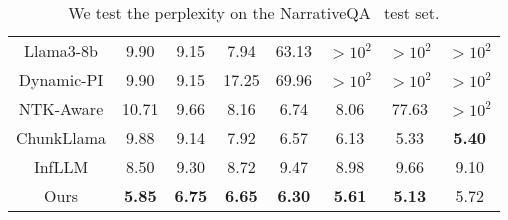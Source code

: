 \begin{table}[t]
{\begin{tabular}{cccccccc}
\renewcommand{\arraystretch}{1} %
Llama3-8b & 9.90  & 9.15  & 7.94  & 63.13 & $>10^2$ & $>10^2$ & $>10^2$   \\

\arrayrulecolor[gray]{0.8}
\midrule
\arrayrulecolor{black}
Dynamic-PI  & 9.90  & 9.15  & 17.25 & 69.96  & $>10^2$ & $>10^2$ & $>10^2$\\
NTK-Aware  & 10.71 & 9.66  & 8.16  & 6.74  & 8.06 &  77.63 & $>10^2$ \\
ChunkLlama & 9.88  & 9.14  & 7.92  & 6.57  & 6.13   & 5.33 & \textbf{5.40} \\
InfLLM & 8.50  & 9.30  & 8.72  & 9.47  & 8.98   &  9.66 & 9.10 \\
Ours & \textbf{5.85}  & \textbf{6.75}  & \textbf{6.65}  & \textbf{6.30}  & \textbf{5.61}   &  \textbf{5.13}  &  5.72  \\

\bottomrule

\end{tabular}
}
\vspace{-1mm}
\caption{We test the perplexity on the NarrativeQA~\citep{kovcisky2018narrativeqa} test set.}
\vspace{-8mm}
\label{PPL}

\end{table}